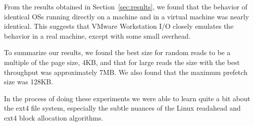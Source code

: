 From the results obtained in Section~\ref{sec:results}, we found that the behavior
of identical OSs running directly on a machine and in a virtual machine was 
nearly identical. This suggests that VMware Workstation I/O closely emulates 
the behavior in a real machine, except with some small overhead.

To summarize our results, we found the best size for random reads to be a multiple 
of the page size, 4KB, and that for large reads the size with the best throughput
was approximately 7MB. We also found that the maximum prefetch size was 128KB.

In the process of doing these experiments we were able to learn quite a bit about
the ext4 file system, especially the subtle nuances of the Linux readahead and ext4
block allocation algorithms.
